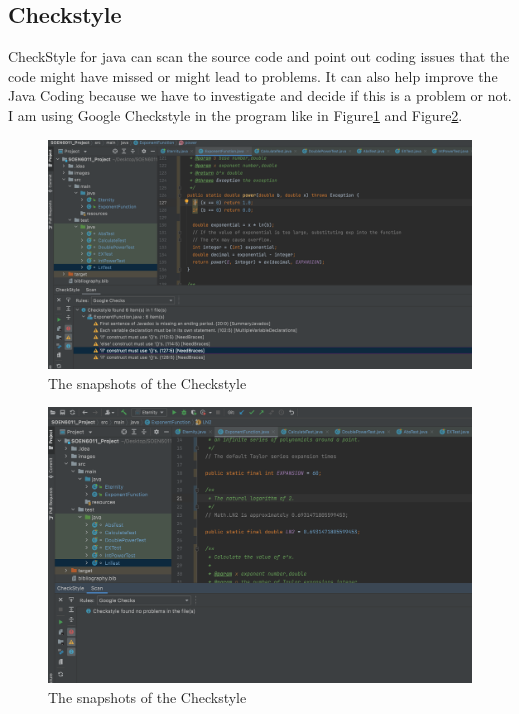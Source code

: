 \documentclass[11pt]{article}
\begin{document}
\subsection{Checkstyle}
CheckStyle for java can scan the source code and point out coding issues that the code might have missed or might lead to problems.
It can also help improve the Java Coding because we have to investigate and decide if this is a problem or not. I am using Google Checkstyle in the program like in Figure\ref{fig:Checkstyle} and Figure\ref{fig:Checkstyle2}.
\begin{figure}[h]
    \centering
    \includegraphics[width=15cm]{images/checkstyle.png}
    \caption{The snapshots of the Checkstyle}
    \label{fig:Checkstyle}
\end{figure}

\begin{figure}[h]
    \centering
    \includegraphics[width=15cm]{images/check2.png}
    \caption{The snapshots of the Checkstyle}
    \label{fig:Checkstyle2}
\end{figure}
\end{document}
